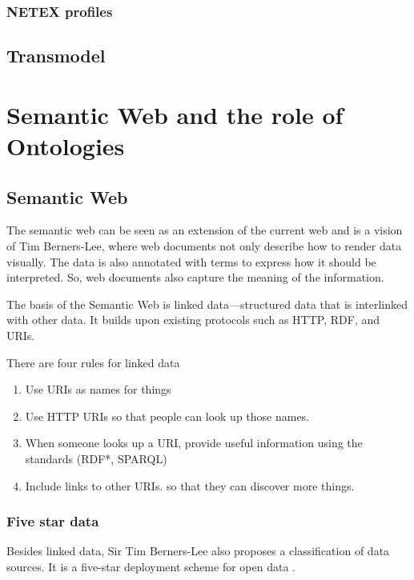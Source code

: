 \subsubsection{NETEX profiles}
\subsection{Transmodel}
\section{Semantic Web and the role of Ontologies}\label{section:ontologies_rel_work}
\subsection{Semantic Web}
The semantic web can be seen as an extension of the current web and is a vision of Tim Berners-Lee, where web documents not only describe how to render data visually. The data is also annotated with terms to express how it should be interpreted. So, web documents also capture the meaning of the information.

The basis of the Semantic Web is linked data—structured data that is interlinked with other data. It builds upon existing protocols such as HTTP, RDF, and URIs.

There are four rules for linked data
\begin{enumerate}
    \item Use URIs as names for things

    \item Use HTTP URIs so that people can look up those names.

    \item When someone looks up a URI, provide useful information using the standards (RDF*, SPARQL)

    \item Include links to other URIs. so that they can discover more things.

\end{enumerate}

\subsubsection{Five star data}
Besides linked data, Sir Tim Berners-Lee also proposes a classification of data sources. It is a five-star deployment scheme for open data \cite{noauthor_5-star_nodate}.

